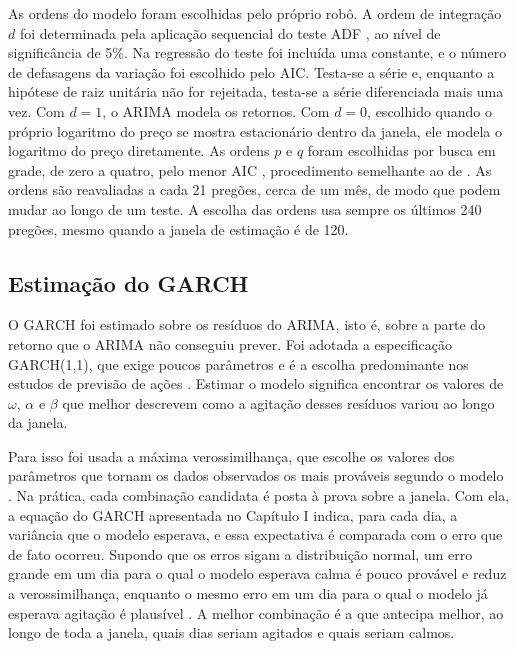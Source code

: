 As ordens do modelo foram escolhidas pelo próprio robô. A ordem de integração $d$
foi determinada pela aplicação sequencial do teste ADF \cite{thomaz2019}, ao nível
de significância de 5\%. Na regressão do teste foi incluída uma constante, e o
número de defasagens da variação foi escolhido pelo AIC. Testa-se a série e, enquanto a hipótese de raiz unitária
não for rejeitada, testa-se a série diferenciada mais uma vez. Com $d = 1$, o ARIMA modela os retornos. Com $d = 0$,
escolhido quando o próprio logaritmo do preço se mostra estacionário dentro da
janela, ele modela o logaritmo do preço diretamente. As ordens $p$ e $q$ foram
escolhidas por busca em grade, de zero a quatro, pelo menor AIC
\cite{thomaz2019}, procedimento semelhante ao de . As ordens
são reavaliadas a cada 21 pregões, cerca de um mês, de modo que podem mudar ao
longo de um teste. A escolha das ordens usa sempre os últimos 240 pregões, mesmo
quando a janela de estimação é de 120.

\subsection{Estimação do GARCH}

O GARCH foi estimado sobre os resíduos do ARIMA, isto é, sobre a parte do retorno
que o ARIMA não conseguiu prever. Foi adotada a especificação GARCH(1,1), que exige
poucos parâmetros e é a escolha predominante nos estudos de previsão de ações
\cite{xing2024}. Estimar o modelo significa encontrar os valores de $\omega$,
$\alpha$ e $\beta$ que melhor descrevem como a agitação desses resíduos variou ao
longo da janela.

Para isso foi usada a máxima verossimilhança, que escolhe os valores dos
parâmetros que tornam os dados observados os mais prováveis segundo o modelo
\cite[p.~41]{thomaz2019}. Na prática, cada combinação candidata é posta à prova
sobre a janela. Com ela, a equação do GARCH apresentada no Capítulo I indica, para
cada dia, a variância que o modelo esperava, e essa expectativa é comparada com o
erro que de fato ocorreu. Supondo que os erros sigam a distribuição normal, um erro
grande em um dia para o qual o modelo esperava calma é pouco provável e reduz a
verossimilhança, enquanto o mesmo erro em um dia para o qual o modelo já esperava
agitação é plausível \cite[p.~43]{thomaz2019}. A melhor combinação é a que
antecipa melhor, ao longo de toda a janela, quais dias seriam agitados e quais
seriam calmos.

